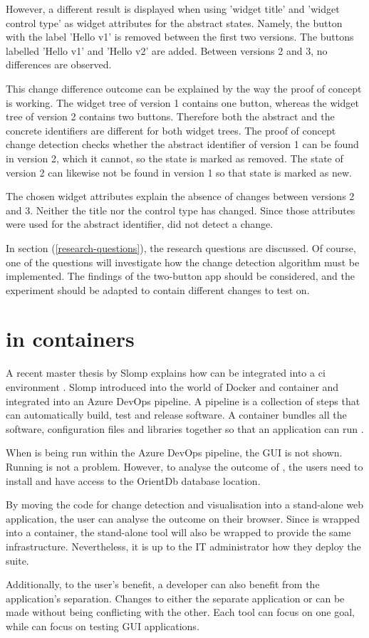 However, a different result is displayed when using 'widget title' and 'widget control type' as widget attributes for the abstract states. Namely, the button with the label 'Hello v1' is removed between the first two versions. The buttons labelled 'Hello v1' and 'Hello v2' are added. Between versions 2 and 3, no differences are observed.

This change difference outcome can be explained by the way the proof of concept is working. The widget tree of version 1 contains one button, whereas the widget tree of version 2 contains two buttons. Therefore both the abstract and the concrete identifiers are different for both widget trees. The proof of concept change detection checks whether the abstract identifier of version 1 can be found in version 2, which it cannot, so the state is marked as removed. The state of version 2 can likewise not be found in version 1 so that state is marked as new.

The chosen widget attributes explain the absence of changes between versions 2 and 3. Neither the title nor the control type has changed. Since those attributes were used for the abstract identifier, \testar did not detect a change. 

In section (\ref{research-questions}), the research questions are discussed. Of course, one of the questions will investigate how the change detection algorithm must be implemented. The findings of the two-button app should be considered, and the experiment should be adapted to contain different changes to test on. 

\section{\testar in containers}\label{sec:testar-in-docker}
A recent master thesis by Slomp explains how \testar can be integrated into a \acrfull{ci} environment \cite{thesisSlomp}. Slomp introduced \testar into the world of Docker and container and integrated \testar into an Azure DevOps pipeline. A pipeline is a collection of steps that can automatically build, test and release software. A container bundles all the software, configuration files and libraries together so that an application can run \cite{ms-container}. 

When \testar is being run within the Azure DevOps pipeline, the \testar GUI is not shown. Running \testar is not a problem. However, to analyse the outcome of \testar, the users need to install \testar and have access to the OrientDb database location. 

By moving the code for change detection and visualisation into a stand-alone web application, the user can analyse the outcome on their browser. Since \testar is wrapped into a container, the stand-alone tool will also be wrapped to provide the same infrastructure. Nevertheless, it is up to the IT administrator how they deploy the \testar suite. 

Additionally, to the user's benefit, a \testar developer can also benefit from the application's separation. Changes to either the separate application or \testar can be made without being conflicting with the other. Each tool can focus on one goal, while \testar can focus on testing GUI applications. 